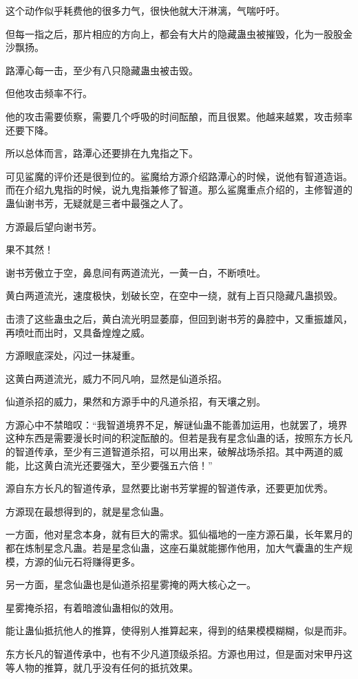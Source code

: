 \begin{this_body}
这个动作似乎耗费他的很多力气，很快他就大汗淋漓，气喘吁吁。

但每一指之后，那片相应的方向上，都会有大片的隐藏蛊虫被摧毁，化为一股股金沙飘扬。

路潭心每一击，至少有八只隐藏蛊虫被击毁。

但他攻击频率不行。

他的攻击需要侦察，需要几个呼吸的时间酝酿，而且很累。他越来越累，攻击频率还要下降。

所以总体而言，路潭心还要排在九鬼指之下。

可见鲨魔的评价还是很到位的。鲨魔给方源介绍路潭心的时候，说他有智道造诣。而在介绍九鬼指的时候，说九鬼指兼修了智道。那么鲨魔重点介绍的，主修智道的蛊仙谢书芳，无疑就是三者中最强之人了。

方源最后望向谢书芳。

果不其然！

谢书芳傲立于空，鼻息间有两道流光，一黄一白，不断喷吐。

黄白两道流光，速度极快，划破长空，在空中一绕，就有上百只隐藏凡蛊损毁。

击溃了这些蛊虫之后，黄白流光明显萎靡，但回到谢书芳的鼻腔中，又重振雄风，再喷吐而出时，又具备煌煌之威。

方源眼底深处，闪过一抹凝重。

这黄白两道流光，威力不同凡响，显然是仙道杀招。

仙道杀招的威力，果然和方源手中的凡道杀招，有天壤之别。

方源心中不禁暗叹：“我智道境界不足，解谜仙蛊不能善加运用，也就罢了，境界这种东西是需要漫长时间的积淀酝酿的。但若是我有星念仙蛊的话，按照东方长凡的智道传承，至少有三道智道杀招，可以用出来，破解战场杀招。其中两道的威能，比这黄白流光还要强大，至少要强五六倍！”

源自东方长凡的智道传承，显然要比谢书芳掌握的智道传承，还要更加优秀。

方源现在最想得到的，就是星念仙蛊。

一方面，他对星念本身，就有巨大的需求。狐仙福地的一座方源石巢，长年累月的都在炼制星念凡蛊。若是星念仙蛊，这座石巢就能挪作他用，加大气囊蛊的生产规模，方源的仙元石将赚得更多。

另一方面，星念仙蛊也是仙道杀招星雾掩的两大核心之一。

星雾掩杀招，有着暗渡仙蛊相似的效用。

能让蛊仙抵抗他人的推算，使得别人推算起来，得到的结果模模糊糊，似是而非。

东方长凡的智道传承中，也有不少凡道顶级杀招。方源也用过，但是面对宋甲丹这等人物的推算，就几乎没有任何的抵抗效果。


\end{this_body}
